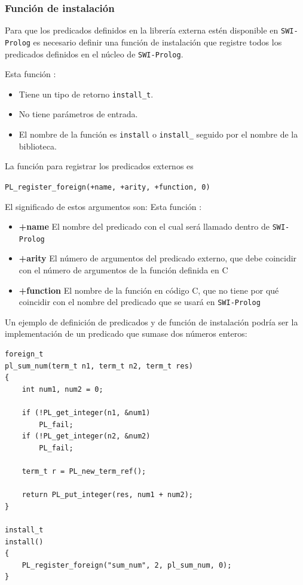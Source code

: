 \documentclass[a4paper]{article}
\begin{document}
\subsubsection{Función de instalación}
Para que los predicados definidos en la librería externa estén disponible en \texttt{SWI-Prolog} es necesario definir una función de instalación que registre todos los predicados definidos en el núcleo de \texttt{SWI-Prolog}.

Esta función :
\begin{itemize}
	\item Tiene un tipo de retorno \texttt{install\_t}.
	\item No tiene parámetros de entrada.
	\item El nombre de la función es \texttt{install} o \texttt{install\_} seguido por el nombre de la biblioteca.
\end{itemize}

La función para registrar los predicados externos es

\texttt{PL\_register\_foreign(+name, +arity, +function, 0)}

El significado de estos argumentos son:
Esta función :
\begin{itemize}
	\item \textbf{+name} El nombre del predicado con el cual será llamado dentro de \texttt{SWI-Prolog}
	\item \textbf{+arity} El número de argumentos del predicado externo, que debe coincidir con el número de argumentos de la función definida en C
	\item \textbf{+function} El nombre de la función en código C, que no tiene por qué coincidir con el nombre del predicado que se usará en \texttt{SWI-Prolog}
\end{itemize}

Un ejemplo de definición de predicados y de función de instalación podría ser la implementación de un predicado que sumase dos números enteros:

\begin{lstlisting}[style=C++]
foreign_t
pl_sum_num(term_t n1, term_t n2, term_t res)
{
	int num1, num2 = 0;
	
	if (!PL_get_integer(n1, &num1)
		PL_fail;
	if (!PL_get_integer(n2, &num2)
		PL_fail;
	
	term_t r = PL_new_term_ref();
	
	return PL_put_integer(res, num1 + num2);
}

install_t
install()
{
	PL_register_foreign("sum_num", 2, pl_sum_num, 0);
}
\end{lstlisting}
\end{document}
